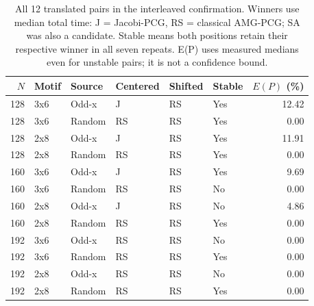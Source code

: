 \begin{table}[t]
\centering
\caption{All 12 translated pairs in the interleaved confirmation. Winners use median total time: J = Jacobi-PCG, RS = classical AMG-PCG; SA was also a candidate. Stable means both positions retain their respective winner in all seven repeats. E(P) uses measured medians even for unstable pairs; it is not a confidence bound.}
\label{tab:portfolio-audit}
\begin{tabular}{rlllllr}
\toprule
$N$ & Motif & Source & Centered & Shifted & Stable & $E(P)$ (\%) \\
\midrule
128 & 3x6 & Odd-x & J & RS & Yes & 12.42 \\
128 & 3x6 & Random & RS & RS & Yes & 0.00 \\
128 & 2x8 & Odd-x & J & RS & Yes & 11.91 \\
128 & 2x8 & Random & RS & RS & Yes & 0.00 \\
160 & 3x6 & Odd-x & J & RS & Yes & 9.69 \\
160 & 3x6 & Random & RS & RS & No & 0.00 \\
160 & 2x8 & Odd-x & J & RS & No & 4.86 \\
160 & 2x8 & Random & RS & RS & Yes & 0.00 \\
192 & 3x6 & Odd-x & RS & RS & No & 0.00 \\
192 & 3x6 & Random & RS & RS & Yes & 0.00 \\
192 & 2x8 & Odd-x & RS & RS & No & 0.00 \\
192 & 2x8 & Random & RS & RS & Yes & 0.00 \\
\bottomrule
\end{tabular}
\end{table}
